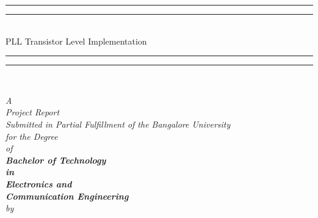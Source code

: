 \begin{titlepage}

  \vspace{1 in}
  \begin{center}
  \newcommand*{\titlegroup}{
    \centering
    \vspace*{\baselineskip} %
	
	\rule{\textwidth}{1.6pt}\vspace*{-\baselineskip}\vspace*{2pt} %
	\rule{\textwidth}{0.4pt}\\[\baselineskip] %
	{\LARGE PLL Transistor Level Implementation} \\
	
	\rule{\textwidth}{0.4pt}\vspace*{-\baselineskip}\vspace{3.2pt} %
	\rule{\textwidth}{1.6pt}\\[\baselineskip] %
	
	\scshape %
	
	\vspace*{1\baselineskip} %
	{\large{\textsl{
				{A \\ 
					  Project Report \\ %
					Submitted in Partial Fulfillment of the Bangalore University\\
					for the Degree \\ 
					of\\
					\large \bf Bachelor of Technology \\
                    in\\
                    \large \bf Electronics and \\
                    \large \bf Communication Engineering 
	}}}}\\
	[5ex] \emph{by} \\[1ex]
  }

  \titlegroup

    
    	

\end{center}
\end{titlepage}
